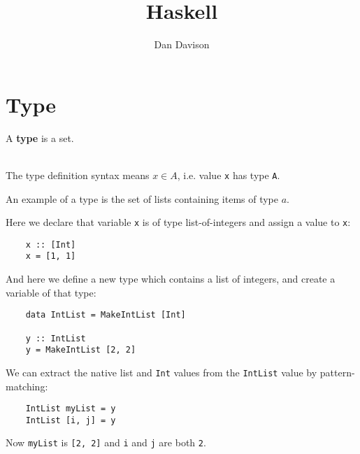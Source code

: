 \documentclass[12pt]{article}
\begin{document}
\title{Haskell}
\date{}
\author{Dan Davison}
\maketitle
\tableofcontents

\section{Type}

\begin{definition*}
  A {\bf type} is a set.
\end{definition*}


\begin{notation*}\hspace{0pt}\\
  The type definition syntax  means $x \in A$, i.e. value {\tt x} has type {\tt A}.
\end{notation*}

\begin{example*}
  An example of a type is the set of lists containing items of type $a$.

  Here we declare that variable {\tt x} is of type list-of-integers and assign a value to
  {\tt x}:
  \begin{verbatim}
    x :: [Int]
    x = [1, 1]
  \end{verbatim}

  And here we define a new type which contains a list of integers, and create a variable of
  that type:
  \begin{verbatim}
    data IntList = MakeIntList [Int]

    y :: IntList
    y = MakeIntList [2, 2]
  \end{verbatim}

  We can extract the native list and {\tt Int} values from the {\tt IntList} value by pattern-matching:
  \begin{verbatim}
    IntList myList = y
    IntList [i, j] = y
  \end{verbatim}
  Now {\tt myList} is {\tt  [2, 2]} and {\tt i} and {\tt j} are both {\tt 2}.

\end{example*}
\end{document}
